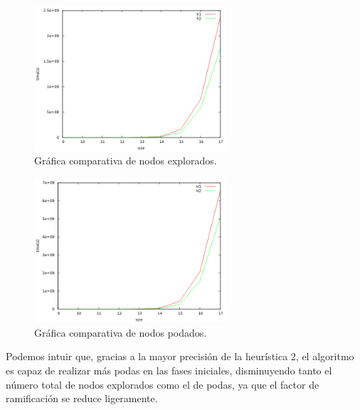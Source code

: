 \documentclass[11pt,a4paper]{article}
\begin{document}
			\vspace{2mm}

			\begin{figure}[h]

				\centering
				\includegraphics[width=0.64\textwidth]{ComparativaExploradosH1-H2.png}
				\caption{Gráfica comparativa de nodos explorados.}
				
			\end{figure}


			\begin{figure}[h]

				\centering
				\includegraphics[width=0.64\textwidth]{ComparativaPodadosH1-H2.png}
				\caption{Gráfica comparativa de nodos podados.}
				
			\end{figure}

			\par
			Podemos intuir que, gracias a la mayor precisión de la heurística 2, el algoritmo es capaz de realizar más podas en las fases iniciales, disminuyendo tanto el número total de nodos explorados como el de podas, ya que el factor de ramificación se reduce ligeramente.

\newpage
\end{document}

